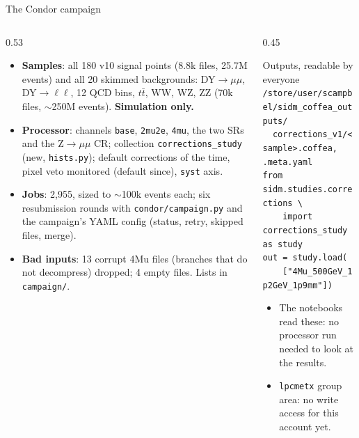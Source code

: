 \documentclass[aspectratio=169,11pt]{beamer}
\newcommand{\code}[1]{{\small\colorbox{codebg}{\texttt{#1}}}}
\begin{document}
\begin{frame}{The Condor campaign}
  \begin{columns}[T]
    \begin{column}{0.53\textwidth}
      \footnotesize
      \begin{itemize}
        \item \textbf{Samples}: all 180 v10 signal points (8.8k files, 25.7M events) and all 20
              skimmed backgrounds: DY$\to\mu\mu$, DY$\to\ell\ell$, 12 QCD bins, $t\bar t$, WW, WZ, ZZ
              (70k files, $\sim$250M events). \textbf{Simulation only.}
        \item \textbf{Processor}: channels \code{base}, \code{2mu2e}, \code{4mu}, the two SRs and the
              Z$\to\mu\mu$ CR; collection \code{corrections\_study} (new, \code{hists.py});
              default corrections of the time, pixel veto monitored (default since),
              \code{syst} axis.
        \item \textbf{Jobs}: 2,955, sized to $\sim$100k events each; six resubmission rounds
              with \code{condor/campaign.py} and the campaign's YAML config (status, retry,
              skipped files, merge).
        \item \textbf{Bad inputs}: 13 corrupt 4Mu files (branches that do not decompress) dropped;
              4 empty files. Lists in \code{campaign/}.
      \end{itemize}
    \end{column}
    \begin{column}{0.45\textwidth}
      {\tiny
      \begin{block}{Outputs, readable by everyone}
        \texttt{/store/user/scampbel/sidm\_coffea\_outputs/}\\
        \texttt{\ \ corrections\_v1/<sample>.coffea, .meta.yaml}\\[0.4em]
        \texttt{from sidm.studies.corrections \textbackslash}\\
        \texttt{\ \ \ \ import corrections\_study as study}\\
        \texttt{out = study.load(}\\
        \texttt{\ \ \ \ ["4Mu\_500GeV\_1p2GeV\_1p9mm"])}
      \end{block}}
      {\footnotesize
      \begin{itemize}
        \item The notebooks read these: no processor run needed to look at the results.
        \item \code{lpcmetx} group area: no write access for this account yet.
      \end{itemize}}
    \end{column}
  \end{columns}
\end{frame}
\end{document}
